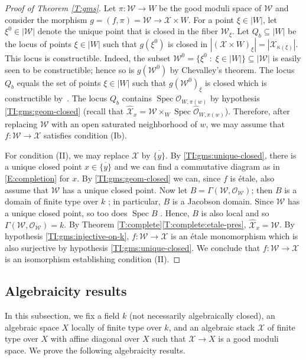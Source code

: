 \documentclass[a4paper]{amsart}
\theoremstyle{plain}
\theoremstyle{definition}
\theoremstyle{remark}
\numberwithin{equation}{section}
\newcommand\cW{\mathcal{W}}
\newcommand\cX{\mathcal{X}}
\newcommand\oh{\mathcal{O}}
\newcommand\co{\colon}
\DeclareMathOperator{\Spec}{Spec}
\renewcommand{\hat}{\widehat}
\newcommand{\itemref}[1]{\eqref{#1}}
\begin{document}
\begin{proof}[Proof of Theorem \ref{T:gms}]
Let $\pi\co \cW\to W$ be the good moduli space of $\cW$ and consider the
morphism $g=(f,\pi)=\cW\to \cX\times W$. For a point $\xi\in |W|$, let
$\xi^0\in |\cW|$ denote the unique point that is closed in the fiber $\cW_\xi$.
Let $Q_b\subseteq |W|$ be the locus of points $\xi\in |W|$ such that $g(\xi^0)$
is closed in $|(\cX\times W)_\xi|=|\cX_{\kappa(\xi)}|$. This locus is
constructible. Indeed, the subset $\cW^0=\{\xi^0\;:\;\xi\in |W|\}\subseteq
|\cW|$ is easily seen to be constructible; hence so is $g(\cW^0)$ by
Chevalley's theorem. The locus $Q_b$ equals the set of points $\xi\in |W|$ such
that $g(\cW^0)_\xi$ is closed which is constructible by~\cite[IV.9.5.4]{EGA}. The
locus $Q_b$ contains $\Spec \oh_{W,\pi(w)}$ by hypothesis
\itemref{TI:gms:geom-closed} (recall that $\hat{\cX}_x=\cW\times_W \Spec
\hat{\oh}_{W,\pi(w)}$). Therefore, after replacing $\cW$ with an open saturated
neighborhood of $w$, we may assume that $f \co \cW \to \cX$ satisfies condition
(Ib).

For condition (II), we may replace $\cX$ by $\overline{ \{y\} }$. By \itemref{TI:gms:unique-closed}, there is a unique closed point $x \in \overline{ \{y\} }$ and we can find a commutative diagram as in \eqref{E:completion} for $x$.  By \itemref{TI:gms:geom-closed} we can, since $f$ is \'etale, also assume that $\cW$ has a unique closed point. Now let $B=\Gamma(\cW,\oh_{\cW})$; then $B$ is a domain of finite type over $k$ \cite[Thm.~4.16(viii),(xi)]{alper-good}; in particular, $B$ is a Jacobson domain. Since $\cW$ has a unique closed point, so too does $\Spec B$ \cite[Thm.~4.16(iii)]{alper-good}. Hence, $B$ is also local and so $\Gamma(\cW, \oh_{\cW}) = k$. By Theorem \ref{T:complete}\itemref{T:complete:etale-pres}, $\hat{\cX}_x = \cW$.  By hypothesis \itemref{TI:gms:injective-on-k}, $f \co \cW \to \cX$ is an \'etale monomorphism which is also surjective by hypothesis \itemref{TI:gms:unique-closed}.  We conclude that $f \co \cW \to \cX$ is an isomorphism establishing condition (II).
\end{proof}

\subsection{Algebraicity results} \label{A:algebraicity}

In this subsection, we fix a field $k$ (not necessarily algebraically closed), an algebraic space $X$ locally of finite type over $k$, and an algebraic stack $\cX$ of finite type over $X$ with affine diagonal over $X$ such that $\cX \to X$ is a good moduli space. We prove the following algebraicity results.
\end{document}
